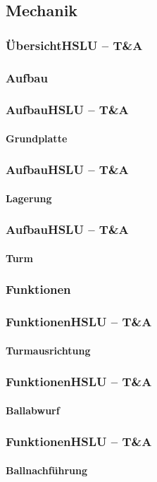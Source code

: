 \subsection{Mechanik}

\author{Christian Schürch}

\begin{frame}
	\frametitle{Übersicht\hfill{}\footnotesize HSLU -- T\&A}
\end{frame}

\subsubsection{Aufbau}
\begin{frame}
	\frametitle{Aufbau\hfill{}\footnotesize HSLU -- T\&A}
	\framesubtitle{Grundplatte}
\end{frame}

\begin{frame}
	\frametitle{Aufbau\hfill{}\footnotesize HSLU -- T\&A}
	\framesubtitle{Lagerung}
\end{frame}

\begin{frame}
	\frametitle{Aufbau\hfill{}\footnotesize HSLU -- T\&A}
	\framesubtitle{Turm}
\end{frame}

\subsubsection{Funktionen}
\begin{frame}
	\frametitle{Funktionen\hfill{}\footnotesize HSLU -- T\&A}
	\framesubtitle{Turmausrichtung}
\end{frame}

\begin{frame}
	\frametitle{Funktionen\hfill{}\footnotesize HSLU -- T\&A}
	\framesubtitle{Ballabwurf}
\end{frame}

\begin{frame}
	\frametitle{Funktionen\hfill{}\footnotesize HSLU -- T\&A}
	\framesubtitle{Ballnachführung}
\end{frame}
